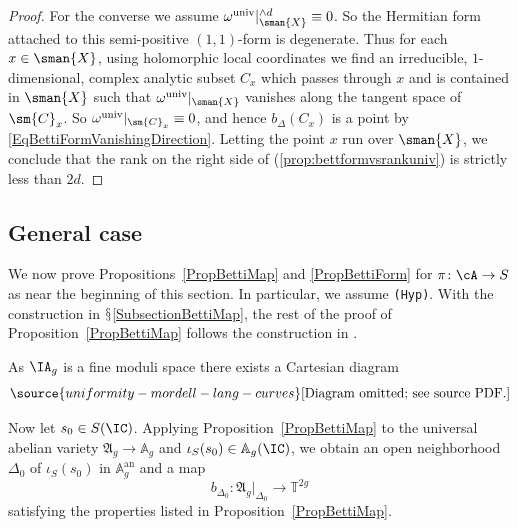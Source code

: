 \begin{proof}
For the converse we assume
${\omega}^{\mathrm{univ}}|_{\sman{X}}^{\wedge d}\equiv 0$. So the
Hermitian form attached to this semi-positive $(1,1)$-form is
degenerate. Thus for each $x \in \sman{X}$, using holomorphic local coordinates we find an irreducible,  $1$-dimensional,  complex analytic subset $C_x$ which passes through $x$ and is contained in $\sman{X}$ such that $\omega^{\mathrm{univ}}|_{\sman{X}}$ vanishes along the tangent space of $\sm{C}_x$. So ${\omega}^{\mathrm{univ}}|_{\sm{C}_x}\equiv 0$, and hence
 $b_\Delta(C_x)$ is a point
by \eqref{EqBettiFormVanishingDirection}.
Letting the point $x$ run over $\sman{X}$, we conclude that the rank on the right
side of (\ref{prop:bettformvsrankuniv}) is strictly less than $2d$.
\end{proof}


\subsection{General case}
We now prove Propositions~\ref{PropBettiMap}
and \ref{PropBettiForm} for
 $\pi \colon \cA \rightarrow S$ as near the beginning of this section.
 In particular, we assume \texttt{(Hyp)}. With the construction in $\mathsection$\ref{SubsectionBettiMap}, the rest of the proof of Proposition~\ref{PropBettiMap} follows the construction in \cite[$\mathsection$4]{GaoBettiRank}.


As
$\IA_g$ is a fine moduli space there exists a Cartesian diagram
\begin{equation*}%
\source{uniformity-mordell-lang-curves}
\text{[Diagram omitted; see source PDF.]}
\end{equation*}

Now let $s_0 \in S(\IC)$. Applying Proposition~\ref{PropBettiMap} to the universal abelian variety $\mathfrak{A}_g \rightarrow \mathbb A_g$ and $\iota_S(s_0) \in \mathbb A_g(\IC)$, we obtain an open neighborhood $\Delta_0$ of $\iota_S(s_0)$ in $\mathbb A_g^{\mathrm{an}}$ and a map
\[
b_{\Delta_0} \colon \mathfrak{A}_g|_{\Delta_0} \rightarrow \mathbb T^{2g}
\]
satisfying the properties listed in Proposition~\ref{PropBettiMap}.

